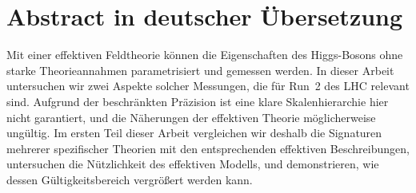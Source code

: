 


\chapter*{Abstract in deutscher \"{U}bersetzung}





Mit einer effektiven Feldtheorie k\"onnen die Eigenschaften des
Higgs-Bosons ohne starke Theorieannahmen parametrisiert und gemessen
werden. In dieser Arbeit untersuchen wir zwei Aspekte solcher
Messungen, die f\"ur Run~2 des LHC relevant sind. Aufgrund der
beschr\"ankten Pr\"azision ist eine klare Skalenhierarchie hier nicht
garantiert, und die N\"aherungen der effektiven Theorie
m\"oglicherweise ung\"ultig. Im ersten Teil dieser Arbeit vergleichen
wir deshalb die Signaturen mehrerer spezifischer Theorien mit den
entsprechenden effektiven Beschreibungen, untersuchen die
N\"utzlichkeit des effektiven Modells, und demonstrieren, wie dessen
G\"ultigkeitsbereich vergr\"o\ss{}ert werden kann.

